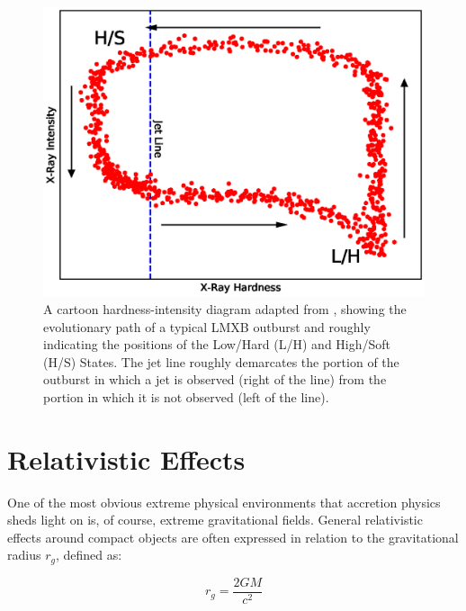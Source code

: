 \begin{figure}
   \centering
    \includegraphics[width=\columnwidth, trim = 0mm 0mm 0mm 0mm, clip]{images/Fender_D.eps}
    \captionsetup{singlelinecheck=off}
    \caption[A cartoon hardness-intensity diagram adapted from \citet{Fender_UniJets}, showing the evolutionary path of a typical LMXB outburst.]{A cartoon hardness-intensity diagram adapted from \citet{Fender_UniJets}, showing the evolutionary path of a typical LMXB outburst and roughly indicating the positions of the Low/Hard (L/H) and High/Soft (H/S) States.  The jet line roughly demarcates the portion of the outburst in which a jet is observed (right of the line) from the portion in which it is not observed (left of the line).}
   \label{fig:Fender}
\end{figure}

\section{Relativistic Effects}

\par One of the most obvious extreme physical environments that accretion physics sheds light on is, of course, extreme gravitational fields.  General relativistic effects around compact objects are often expressed in relation to the gravitational radius $r_g$, defined as:

\begin{equation}
r_g=\frac{2GM}{c^2}
\end{equation}

